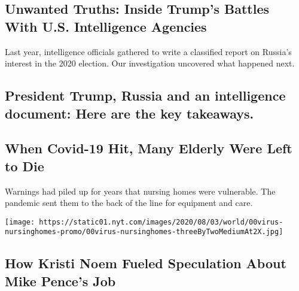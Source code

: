 \href{/2020/08/08/magazine/us-russia-intelligence.html}{}

\hypertarget{unwanted-truths-inside-trumps-battles-with-us-intelligence-agencies}{%
\subsection{Unwanted Truths: Inside Trump's Battles With U.S.
Intelligence
Agencies}\label{unwanted-truths-inside-trumps-battles-with-us-intelligence-agencies}}

Last year, intelligence officials gathered to write a classified report
on Russia's interest in the 2020 election. Our investigation uncovered
what happened next.

\href{/2020/08/08/us/politics/trump-russia.html}{}

\hypertarget{president-trump-russia-and-an-intelligence-document-here-are-the-key-takeaways}{%
\subsection{President Trump, Russia and an intelligence document: Here
are the key
takeaways.}\label{president-trump-russia-and-an-intelligence-document-here-are-the-key-takeaways}}

\href{/2020/08/08/world/europe/coronavirus-nursing-homes-elderly.html}{}

\hypertarget{when-covid-19-hit-many-elderly-were-left-to-die}{%
\subsection{When Covid-19 Hit, Many Elderly Were Left to
Die}\label{when-covid-19-hit-many-elderly-were-left-to-die}}

Warnings had piled up for years that nursing homes were vulnerable. The
pandemic sent them to the back of the line for equipment and care.

\href{/2020/08/08/world/europe/coronavirus-nursing-homes-elderly.html}{}

\texttt{[image: https://static01.nyt.com/images/2020/08/03/world/00virus-nursinghomes-promo/00virus-nursinghomes-threeByTwoMediumAt2X.jpg]}

\href{/2020/08/08/us/politics/kristi-noem-pence-trump.html}{}

\hypertarget{how-kristi-noem-fueled-speculation-about-mike-pences-job}{%
\subsection{How Kristi Noem Fueled Speculation About Mike Pence's
Job}\label{how-kristi-noem-fueled-speculation-about-mike-pences-job}}

